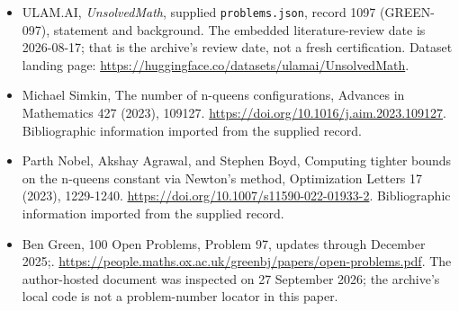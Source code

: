 \documentclass[11pt,a4paper]{article}
\begin{document}
{\small

\begin{itemize}

\item[\hypertarget{source:1097:1}{S1}] ULAM.AI, \emph{UnsolvedMath}, supplied \texttt{problems.json}, record 1097 (GREEN-097), statement and background. The embedded literature-review date is 2026-08-17; that is the archive’s review date, not a fresh certification. Dataset landing page: \url{https://huggingface.co/datasets/ulamai/UnsolvedMath}.

\item[\hypertarget{source:1097:2}{S2}] Michael Simkin, The number of n-queens configurations, Advances in Mathematics 427 (2023), 109127. \url{https://doi.org/10.1016/j.aim.2023.109127}. Bibliographic information imported from the supplied record.

\item[\hypertarget{source:1097:3}{S3}] Parth Nobel, Akshay Agrawal, and Stephen Boyd, Computing tighter bounds on the n-queens constant via Newton's method, Optimization Letters 17 (2023), 1229-1240. \url{https://doi.org/10.1007/s11590-022-01933-2}. Bibliographic information imported from the supplied record.

\item[\hypertarget{source:1097:4}{S4}] Ben Green, 100 Open Problems, Problem 97, updates through December 2025;. \url{https://people.maths.ox.ac.uk/greenbj/papers/open-problems.pdf}. The author-hosted document was inspected on 27 September 2026; the archive’s local code is not a problem-number locator in this paper.

\end{itemize}

}

\label{end:1097}
\end{document}
